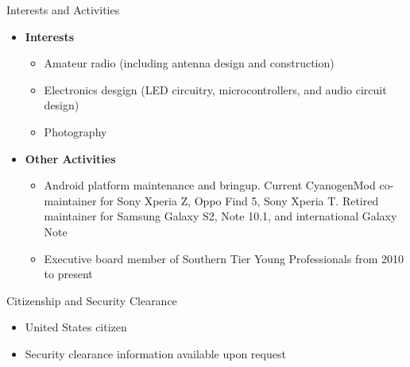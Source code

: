 \documentclass[10pt,oneside]{article}
\newenvironment{ressection}[1]{
	\vspace{4pt}
	{\Large#1}
	\begin{itemize}
	\vspace{3pt}
}{
	\end{itemize}
}
\newcommand{\resitem}[1]{
	\vspace{-4pt}
	\item \begin{flushleft} #1 \end{flushleft}
}
\newcommand{\ressubitem}[1]{
	\vspace{-1pt}
	\item \begin{flushleft} #1 \end{flushleft}
}
\newenvironment{reslist}[1]{
	\resitem{\textbf{#1}}
	\vspace{-5pt}
	\begin{itemize}
}{
	\end{itemize}
}
\newenvironment{ressection}[1]{
	\vspace{4pt}
	{\fontfamily{phv}\selectfont\Large#1}
	\begin{itemize}
	\vspace{3pt}
}{
	\end{itemize}
}
\newcommand{\resitem}[1]{
	\vspace{-4pt}
	\item \begin{flushleft} #1 \end{flushleft}
}
\newcommand{\ressubitem}[1]{
	\vspace{-1pt}
	\item \begin{flushleft} #1 \end{flushleft}
}
\newenvironment{reslist}[1]{
	\resitem{\textbf{#1}}
	\vspace{-5pt}
	\begin{itemize}
}{
	\end{itemize}
}
\begin{document}
\begin{ressection}{Interests and Activities}
	\begin{reslist}{Interests}
		\ressubitem{Amateur radio (including antenna design and construction)}
		\ressubitem{Electronics desgign (LED circuitry, microcontrollers, and audio circuit design)}
		\ressubitem{Photography}
	\end{reslist}

	\begin{reslist}{Other Activities}
		\ressubitem{Android platform maintenance and bringup.  Current CyanogenMod co-maintainer for Sony Xperia Z, Oppo Find 5, Sony Xperia T.  Retired maintainer for Samsung Galaxy S2, Note 10.1, and international Galaxy Note}
		\ressubitem{Executive board member of Southern Tier Young Professionals from 2010 to present}
	\end{reslist}
\end{ressection}

\begin{ressection}{Citizenship and Security Clearance}

	\resitem{United States citizen}

	\resitem{Security clearance information available upon request}

\end{ressection}
\end{document}
